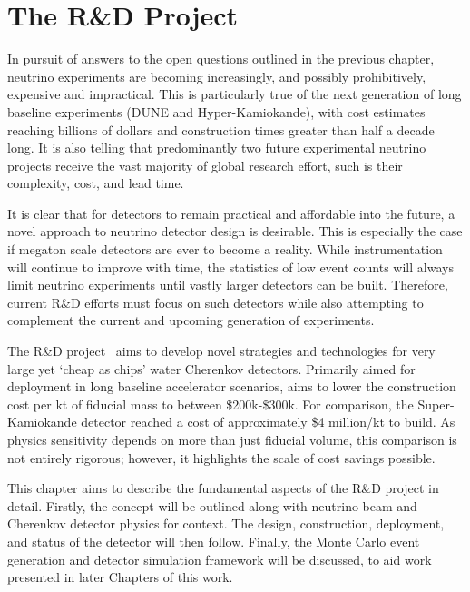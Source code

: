 \chapter{The \chips R\&D Project} %
\label{chap:chips}

In pursuit of answers to the open questions outlined in the previous chapter, neutrino experiments
are becoming increasingly, and possibly prohibitively, expensive and impractical. This is
particularly true of the next generation of long baseline experiments (DUNE and Hyper-Kamiokande),
with cost estimates reaching billions of dollars and construction times greater than half a decade
long. It is also telling that predominantly two future experimental neutrino projects receive the
vast majority of global research effort, such is their complexity, cost, and lead time.

It is clear that for detectors to remain practical and affordable into the future, a novel
approach to neutrino detector design is desirable. This is especially the case if megaton scale
detectors are ever to become a reality. While instrumentation will continue to improve with time,
the statistics of low event counts will always limit neutrino experiments until vastly larger
detectors can be built. Therefore, current R\&D efforts must focus on such detectors while also
attempting to complement the current and upcoming generation of experiments.

The \chips R\&D project~\cite{adamson2013} aims to develop novel strategies and technologies for
very large yet `cheap as chips' water Cherenkov detectors. Primarily aimed for deployment in long
baseline accelerator scenarios, \chips aims to lower the construction cost per kt of fiducial mass
to between \$200k-\$300k. For comparison, the Super-Kamiokande detector reached a cost of
approximately \$4 million/kt to build. As physics sensitivity depends on more than just fiducial
volume, this comparison is not entirely rigorous; however, it highlights the scale of cost savings
possible.

This chapter aims to describe the fundamental aspects of the \chips R\&D project in detail.
Firstly, the \chips concept will be outlined along with neutrino beam and Cherenkov detector
physics for context. The design, construction, deployment, and status of the \chipsfive detector
will then follow. Finally, the Monte Carlo event generation and detector simulation framework will
be discussed, to aid work presented in later Chapters of this work.

